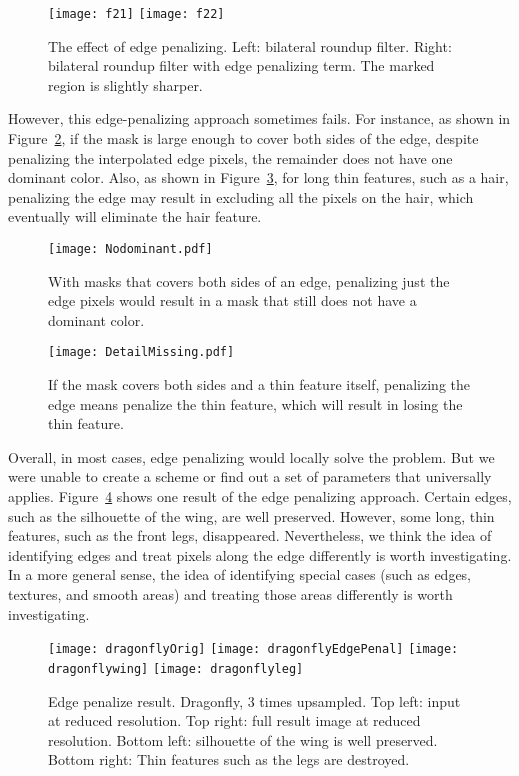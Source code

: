\begin{figure}[htbp]\centering
\texttt{[image: f21]}
\texttt{[image: f22]}
\caption{The effect of edge penalizing. Left: bilateral roundup filter. Right: bilateral roundup filter with edge penalizing term. The marked region is slightly sharper.}
\label{fig:effectOfEdgePenalizing}
\end{figure}

However, this edge-penalizing approach sometimes fails. For instance, as shown in Figure~\ref{fig:edgePenalizeProblem1}, if the mask is large enough to cover both sides of the edge, despite penalizing the interpolated edge pixels, the remainder does not have one dominant color. Also, as shown in Figure~\ref{fig:edgePenalizeProblem2}, for long thin features, such as a hair, penalizing the edge may result in excluding all the pixels on the hair, which eventually will eliminate the hair feature. 

\begin{figure}[htbp]\centering
\texttt{[image: Nodominant.pdf]}
\caption{With masks that covers both sides of an edge, penalizing just the edge pixels would result in a mask that still does not have a dominant color.}
\label{fig:edgePenalizeProblem1}
\end{figure}

\begin{figure}[htbp]\centering
\texttt{[image: DetailMissing.pdf]}
\caption{If the mask covers both sides and a thin feature itself, penalizing the edge means penalize the thin feature, which will result in losing the thin feature.}
\label{fig:edgePenalizeProblem2}
\end{figure}

Overall, in most cases, edge penalizing would locally solve the problem. But we were unable to create a scheme or find out a set of parameters that universally applies. Figure~\ref{fig:edgePenalizeResult} shows one result of the edge penalizing approach. Certain edges, such as the silhouette of the wing, are well preserved. However, some long, thin features, such as the front legs, disappeared. Nevertheless, we think the idea of identifying edges and treat pixels along the edge differently is worth investigating. In a more general sense, the idea of identifying special cases (such as edges, textures, and smooth areas) and treating those areas differently is worth investigating. 

\begin{figure}[htbp]\centering
\texttt{[image: dragonflyOrig]}
\texttt{[image: dragonflyEdgePenal]}
\texttt{[image: dragonflywing]}
\texttt{[image: dragonflyleg]}
\caption{Edge penalize result. Dragonfly, 3 times upsampled. Top left: input at reduced resolution. Top right: full result image at reduced resolution. Bottom left: silhouette of the wing is well preserved. Bottom right: Thin features such as the legs are destroyed. }
\label{fig:edgePenalizeResult}
\end{figure}


